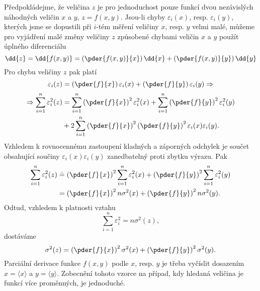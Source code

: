       Předpokládejme, že veličina \(z\) je pro jednoduchost pouze funkcí dvou nezávislých náhodných
      veličin \(x\) a \(y\), \(z = f(x,y)\). Jsou-li chyby \(\varepsilon_i(x)\), resp. 
      \(\varepsilon_i(y)\), kterých jsme se dopustili při \(i\)-tém měření veličiny \(x\), resp. 
      \(y\) velmi malé, můžeme pro vyjádření malé změny veličiny \(z\) způsobené chybami veličin 
      \(x\) a \(y\) použít úplného diferenciálu
      \begin{equation*}
        \dd{z} = \dd{f(x,y)} = \left(\pder{f(x,y)}{x}\right)\dd{x} + 
                               \left(\pder{f(x,y)}{y}\right)\dd{y}
      \end{equation*}
      Pro chybu veličiny \(z\) pak platí
      \begin{equation*}
        \varepsilon_i(z) = \left(\pder{f}{x}\right)\varepsilon_i(x) + 
                           \left(\pder{f}{y}\right)\varepsilon_i(y) \Rightarrow
      \end{equation*}
      \begin{gather*}
        \begin{align*}
          \Rightarrow \sum_{i=1}^{n}\varepsilon_i^2(z) 
          &=  \sum_{i=1}^{n}\left(\pder{f}{x}\right)^2\varepsilon_i^2(x) 
           +  \sum_{i=1}^{n}\left(\pder{f}{y}\right)^2\varepsilon_i^2(y)    \\
          &+ 2\sum_{i=1}^{n}\left(\pder{f}{x}\right)^2\left(\pder{f}{y}\right)^2\varepsilon_i(x)
            \varepsilon_i(y).
        \end{align*}
      \end{gather*}
      Vzhledem k rovnocennému zastoupení kladných a záporných odchylek je součet obsahující
      součiny \(\varepsilon_i(x)\varepsilon_i(y)\) zanedbatelný proti zbytku výrazu. Pak
      \begin{align*}
        \sum_{i=1}^{n}\varepsilon_i^2(z) 
          &\doteq \left(\pder{f}{x}\right)^2 \sum_{i=1}^{n}\varepsilon_i^2(x) + 
                  \left(\pder{f}{y}\right)^2\sum_{i=1}^{n}\varepsilon_i^2(y)                 \\ 
          &= \left(\pder{f}{x}\right)^2 n\sigma^2(x) + \left(\pder{f}{y}\right)^2n\sigma^2(y).
      \end{align*}
      Odtud, vzhledem k platnosti vztahu
      \begin{equation*}
        \sum_{i=1}^{n}\varepsilon_i^2 = n\sigma^2(z),
      \end{equation*}
      dostáváme
      \begin{equation}\label{mai:eq075}
        \sigma^2(z) = \left(\pder{f}{x}\right)^2\sigma^2(x)
                    + \left(\pder{f}{y}\right)^2\sigma^2(y).
      \end{equation}
      Parciální derivace funkce \(f(x, y)\) podle \(x\), resp. \(y\) je třeba vyčíslit dosazením 
      \(x = \langle x\rangle\) a \(y = \langle y \rangle\). Zobecnění tohoto vzorce na případ, kdy 
      hledaná veličina je funkcí více proměnných, je jednoduché.
      
